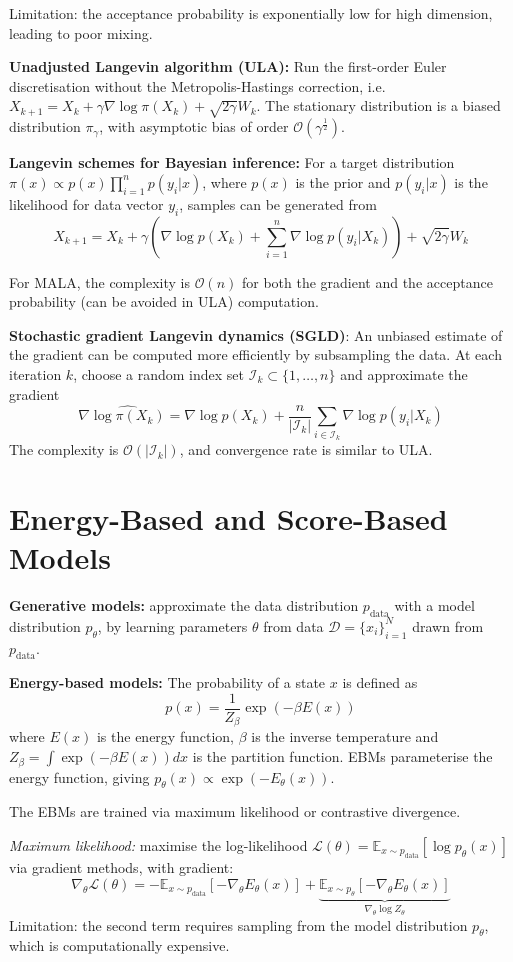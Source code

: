 \documentclass[12pt]{article}
\begin{document}
Limitation: the acceptance probability is exponentially low for high dimension, leading to poor mixing.

\textbf{Unadjusted Langevin algorithm (ULA):} Run the first-order Euler discretisation without the Metropolis-Hastings correction, i.e. $X_{k+1} = X_k + \gamma \nabla \log \pi(X_k) + \sqrt{2\gamma} W_k$. The stationary distribution is a biased distribution $\pi_\gamma$, with asymptotic bias of order $\mathcal{O}(\gamma^\frac{1}{2})$.

\textbf{Langevin schemes for Bayesian inference:} For a target distribution $\pi(x) \propto p(x)\prod_{i=1}^n p(y_i|x)$, where $p(x)$ is the prior and $p(y_i|x)$ is the likelihood for data vector $y_i$, samples can be generated from
$$
X_{k+1} = X_k + \gamma \left(\nabla \log p(X_k) + \sum_{i=1}^n \nabla \log p(y_i|X_k)\right) + \sqrt{2\gamma} W_k
$$

For MALA, the complexity is $\mathcal{O}(n)$ for both the gradient and the acceptance probability (can be avoided in ULA) computation. 

\textbf{Stochastic gradient Langevin dynamics (SGLD)}: An unbiased estimate of the gradient can be computed more efficiently by subsampling the data. At each iteration $k$, choose a random index set $\mathcal{I}_k \subset \{1, \dots, n\}$ and approximate the gradient
$$
\nabla \widehat{\log \pi(X_k)} = \nabla \log p(X_k) + \frac{n}{|\mathcal{I}_k|} \sum_{i \in \mathcal{I}_k} \nabla \log p(y_i|X_k)
$$
The complexity is $\mathcal{O}(|\mathcal{I}_k|)$, and convergence rate is similar to ULA.

\section{Energy-Based and Score-Based Models}
\textbf{Generative models:} approximate the data distribution $p_\text{data}$ with a model distribution $p_\theta$, by learning parameters $\theta$ from data $\mathcal{D} = \{x_i\}_{i=1}^N$ drawn from $p_\text{data}$. 

\textbf{Energy-based models:} The probability of a state $x$ is defined as 
$$p(x) = \frac{1}{Z_\beta} \exp(-\beta E(x))$$
where $E(x)$ is the energy function, $\beta$ is the inverse temperature and $Z_\beta = \int \exp(-\beta E(x)) dx$ is the partition function.
EBMs parameterise the energy function, giving $p_\theta(x) \propto \exp(-E_\theta(x))$.

The EBMs are trained via maximum likelihood or contrastive divergence.

\textit{Maximum likelihood:} maximise the log-likelihood $\mathcal{L}(\theta) = \mathbb{E}_{x \sim p_\text{data}}[\log p_\theta(x)]$ via gradient methods, with gradient:
$$
\nabla_\theta \mathcal{L}(\theta) = - \mathbb{E}_{x \sim p_\text{data}}[-\nabla_\theta E_\theta(x)] + \underbrace{\mathbb{E}_{x \sim p_\theta}[-\nabla_\theta E_\theta(x)]}_{\nabla_\theta \log Z_\theta}
$$
Limitation: the second term requires sampling from the model distribution $p_\theta$, which is computationally expensive.
\end{document}
